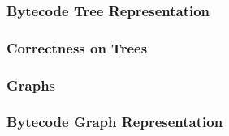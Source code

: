         \begin{frame}
            \frametitle{Bytecode Tree Representation}
        \end{frame}
                
        \begin{frame}
            \frametitle{Correctness on Trees}
        \end{frame}

        \begin{frame}
            \frametitle{Graphs}
            
        \end{frame}
         
         \begin{frame}
            \frametitle{Bytecode Graph Representation}
        \end{frame}

